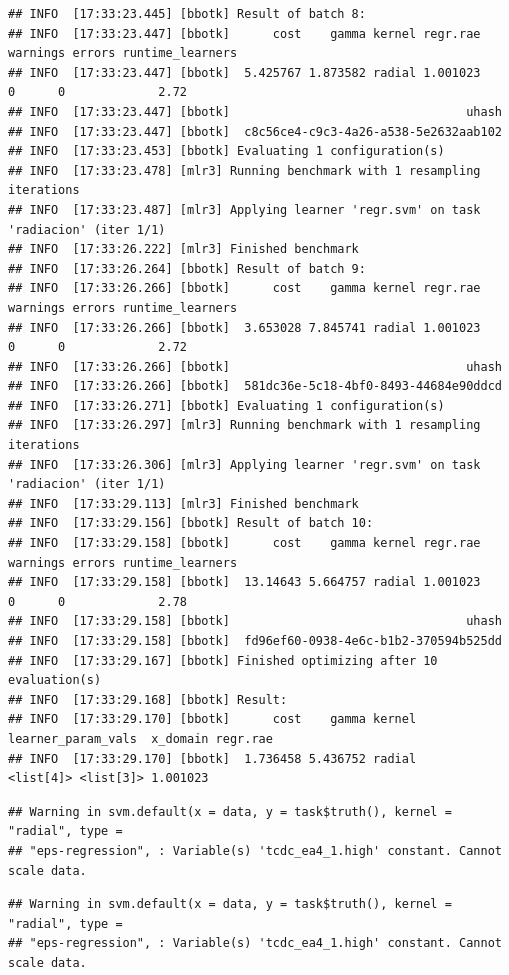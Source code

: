 \documentclass[
  11pt,
  a4paper,
]{article}
\begin{document}
\begin{verbatim}
## INFO  [17:33:23.445] [bbotk] Result of batch 8:
## INFO  [17:33:23.447] [bbotk]      cost    gamma kernel regr.rae warnings errors runtime_learners
## INFO  [17:33:23.447] [bbotk]  5.425767 1.873582 radial 1.001023        0      0             2.72
## INFO  [17:33:23.447] [bbotk]                                 uhash
## INFO  [17:33:23.447] [bbotk]  c8c56ce4-c9c3-4a26-a538-5e2632aab102
## INFO  [17:33:23.453] [bbotk] Evaluating 1 configuration(s)
## INFO  [17:33:23.478] [mlr3] Running benchmark with 1 resampling iterations
## INFO  [17:33:23.487] [mlr3] Applying learner 'regr.svm' on task 'radiacion' (iter 1/1)
## INFO  [17:33:26.222] [mlr3] Finished benchmark
## INFO  [17:33:26.264] [bbotk] Result of batch 9:
## INFO  [17:33:26.266] [bbotk]      cost    gamma kernel regr.rae warnings errors runtime_learners
## INFO  [17:33:26.266] [bbotk]  3.653028 7.845741 radial 1.001023        0      0             2.72
## INFO  [17:33:26.266] [bbotk]                                 uhash
## INFO  [17:33:26.266] [bbotk]  581dc36e-5c18-4bf0-8493-44684e90ddcd
## INFO  [17:33:26.271] [bbotk] Evaluating 1 configuration(s)
## INFO  [17:33:26.297] [mlr3] Running benchmark with 1 resampling iterations
## INFO  [17:33:26.306] [mlr3] Applying learner 'regr.svm' on task 'radiacion' (iter 1/1)
## INFO  [17:33:29.113] [mlr3] Finished benchmark
## INFO  [17:33:29.156] [bbotk] Result of batch 10:
## INFO  [17:33:29.158] [bbotk]      cost    gamma kernel regr.rae warnings errors runtime_learners
## INFO  [17:33:29.158] [bbotk]  13.14643 5.664757 radial 1.001023        0      0             2.78
## INFO  [17:33:29.158] [bbotk]                                 uhash
## INFO  [17:33:29.158] [bbotk]  fd96ef60-0938-4e6c-b1b2-370594b525dd
## INFO  [17:33:29.167] [bbotk] Finished optimizing after 10 evaluation(s)
## INFO  [17:33:29.168] [bbotk] Result:
## INFO  [17:33:29.170] [bbotk]      cost    gamma kernel learner_param_vals  x_domain regr.rae
## INFO  [17:33:29.170] [bbotk]  1.736458 5.436752 radial          <list[4]> <list[3]> 1.001023
\end{verbatim}

\begin{verbatim}
## Warning in svm.default(x = data, y = task$truth(), kernel = "radial", type =
## "eps-regression", : Variable(s) 'tcdc_ea4_1.high' constant. Cannot scale data.
\end{verbatim}

\begin{verbatim}
## Warning in svm.default(x = data, y = task$truth(), kernel = "radial", type =
## "eps-regression", : Variable(s) 'tcdc_ea4_1.high' constant. Cannot scale data.
\end{verbatim}
\end{document}
